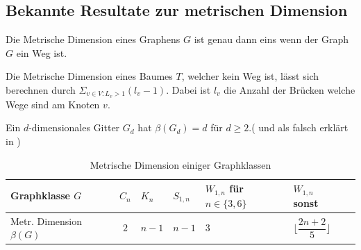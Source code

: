 \subsection{Bekannte Resultate zur metrischen Dimension}
\begin{lem}
\label{path}
Die Metrische Dimension eines Graphens $G$ ist genau dann eins wenn der Graph $G$ ein Weg ist.\cite{landmarks} 
\end{lem}
\begin{lem}
Die Metrische Dimension eines Baumes $T$, welcher kein Weg ist, lässt sich berechnen durch $\Sigma_{v \in V:L_v >1} (l_v-1)$. Dabei ist $l_v$ die Anzahl der Brücken welche Wege sind am Knoten $v$.\cite{landmarks}
\end{lem}
\begin{lem} 
Ein $d$-dimensionales Gitter $G_d$ hat $\beta(G_d)=d$ für $d \geq 2$.(\cite{landmarks} und als falsch erklärt in \cite{somefamiliesofgraphs})
\end{lem}
  \begin{table}[htb]
     \centering
     \begin{tabularx}{\textwidth}{|>{\centering}m{4cm}|c*{5}{|>{\centering\arraybackslash}X}|}
     	\hline  
       \parbox[c][5em][c]{0pt}{~}Graphklasse $G$ & $C_n$&$K_n$& $S_{1,n}$&$W_{1,n}$ für $n \in \{3,6\}$&$W_{1,n}$ sonst \\[2em]
		\hline       
       \parbox[c][5em][c]{0pt}{~}Metr. Dimension $\beta(G)$& $2$       &$n-1$& $n-1$  &$3$  &$\lfloor \dfrac{2n+2}{5} \rfloor$        \\[2em]
       	\hline  
     \end{tabularx}
 
     \caption{Metrische Dimension einiger Graphklassen}
     \label{tbl:Metrische Dimension einiger Graphklassen}
   \end{table}

